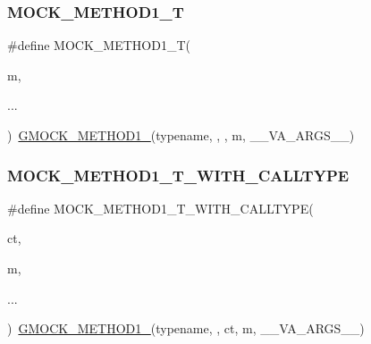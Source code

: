 \mbox{\label{_obj__test_2lib_2googletest-master_2googlemock_2include_2gmock_2gmock-generated-function-mockers_8h_a8e5b9539726be5c7a13f1aa3bcc1f29f}} 
\subsubsection{\texorpdfstring{MOCK\_METHOD1\_T}{MOCK\_METHOD1\_T}}
{\footnotesize\ttfamily \#define M\+O\+C\+K\+\_\+\+M\+E\+T\+H\+O\+D1\+\_\+T(\begin{DoxyParamCaption}\item[{}]{m,  }\item[{}]{... }\end{DoxyParamCaption})~\mbox{\hyperlink{_obj__test_2lib_2googletest-release-1_88_81_2googlemock_2include_2gmock_2gmock-generated-function-mockers_8h_a1bc0012d62440dda77208dabdf4925c9}{G\+M\+O\+C\+K\+\_\+\+M\+E\+T\+H\+O\+D1\+\_\+}}(typename, , , m, \+\_\+\+\_\+\+V\+A\+\_\+\+A\+R\+G\+S\+\_\+\+\_\+)}

\mbox{\label{_obj__test_2lib_2googletest-master_2googlemock_2include_2gmock_2gmock-generated-function-mockers_8h_a3028c1938f6b819b64400c426ef1e30d}} 
\subsubsection{\texorpdfstring{MOCK\_METHOD1\_T\_WITH\_CALLTYPE}{MOCK\_METHOD1\_T\_WITH\_CALLTYPE}}
{\footnotesize\ttfamily \#define M\+O\+C\+K\+\_\+\+M\+E\+T\+H\+O\+D1\+\_\+\+T\+\_\+\+W\+I\+T\+H\+\_\+\+C\+A\+L\+L\+T\+Y\+PE(\begin{DoxyParamCaption}\item[{}]{ct,  }\item[{}]{m,  }\item[{}]{... }\end{DoxyParamCaption})~\mbox{\hyperlink{_obj__test_2lib_2googletest-release-1_88_81_2googlemock_2include_2gmock_2gmock-generated-function-mockers_8h_a1bc0012d62440dda77208dabdf4925c9}{G\+M\+O\+C\+K\+\_\+\+M\+E\+T\+H\+O\+D1\+\_\+}}(typename, , ct, m, \+\_\+\+\_\+\+V\+A\+\_\+\+A\+R\+G\+S\+\_\+\+\_\+)}

